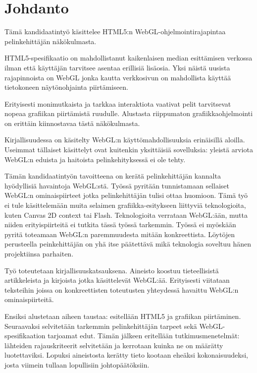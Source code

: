 \section{Johdanto}
\label{sec:johdanto}

Tämä kandidaatintyö käsittelee HTML5:n WebGL-ohjelmointirajapintaa pelinkehittäjän näkökulmasta. 

HTML5-spesifikaatio on mahdollistanut kaikenlaisen median esittämisen verkossa ilman että käyttäjän tarvitsee asentaa erillisiä lisäosia. Yksi näistä uusista rajapinnoista on WebGL jonka kautta verkkosivun on mahdollista käyttää tietokoneen näytönohjainta piirtämiseen.

Erityisesti monimutkaista ja tarkkaa interaktiota vaativat pelit tarvitsevat nopeaa grafiikan piirtämistä ruudulle. Alustasta riippumaton grafiikkaohjelmointi on erittäin kiinnostavaa tästä näkökulmasta. 

Kirjallisuudessa on käsitelty WebGL:n käyttömahdollisuuksia erinäisillä aloilla. Useimmat tällaiset käsittelyt ovat kuitenkin yksittäisiä sovelluksia: yleistä arviota WebGL:n eduista ja haitoista pelinkehityksessä ei ole tehty. 

Tämän kandidaatintyön tavoitteena on kerätä pelinkehittäjän kannalta hyödyllisiä havaintoja WebGL:stä. Työssä pyritään tunnistamaan sellaiset WebGL:n ominaispiirteet jotka  pelinkehittäjän tulisi ottaa huomioon.
Tämä työ ei tule käsittelemään muita selaimen grafiikka-esitykseen liittyviä teknologioita, kuten Canvas 2D context tai Flash. Teknologioita verrataan WebGL:ään, mutta niiden erityispiirteitä ei tutkita tässä työssä tarkemmin. Työssä ei myöskään pyritä toteamaan WebGL:n paremmuudesta mitään konkreettista. Löytöjen perusteella peinkehittäjän on yhä itse päätettävä mikä teknologia soveltuu hänen projektiinsa parhaiten. 

Työ toteutetaan kirjallisuuskatsauksena. Aineisto koostuu tieteellisistä artikkeleista ja kirjoista jotka käsittelevät WebGL:ää. Erityisesti viitataan teksteihin joissa on konkreettisten toteutusten yhteydessä havaittu WebGL:n ominaispiirteitä.

Ensiksi alustetaan aiheen taustaa: esitellään HTML5 ja grafiikan piirtäminen. Seuraavaksi selvitetään tarkemmin pelinkehittäjän tarpeet sekä WebGL-spesifikaation tarjoamat edut. Tämän jälkeen eritellään tutkimusmenetelmät: lähteiden rajauskriteerit selvitetään ja kerrotaan kuinka ne on määrätty luotettaviksi.
Lopuksi aineistosta kerätty tieto kootaan eheäksi kokonaisuudeksi, josta viimein tullaan lopullisiin johtopäätöksiin.